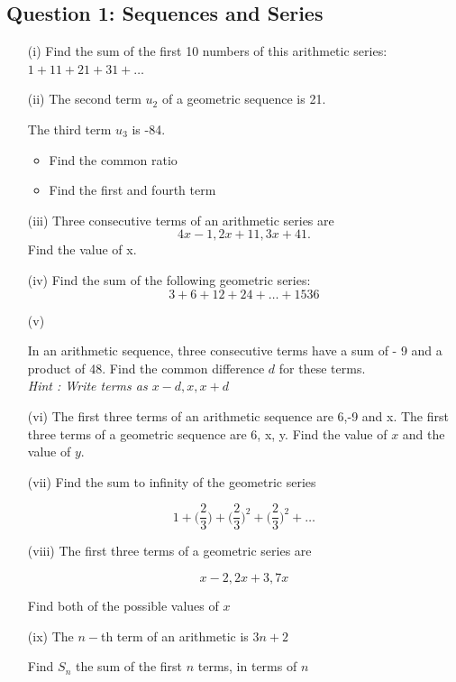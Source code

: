 \documentclass[]{article}
\begin{document}
\subsection*{Question 1:  Sequences and Series}

\begin{enumerate}
	\item[(i)] Find the sum of the first 10 numbers of this arithmetic series: $1 + 11 + 21 + 31 + \ldots$
	
	\item[(ii)] 
	The second term $u_2$ of a geometric sequence is 21.
	
	The third term $u_3$ is -84.
	\begin{itemize}
		\item Find the common ratio 
		\item Find the first and fourth term
	\end{itemize}
	
	\item[(iii)] Three consecutive terms of an arithmetic series are \[4x - 1, 2x +11, 3x + 41. \]
	Find the value of x.
	
	\item[(iv)] Find the sum of the following geometric series: 
	\[3 + 6 + 12 + 24 + \ldots + 1536\]
	
	\item[(v)] 
	
	In an arithmetic sequence, three consecutive terms have a sum of - 9 and a product of 48.
	Find the common difference $d$ for these terms.
	\\
	\textit{\textit{Hint : Write terms as $x-d,x,x+d$}}
	\item[(vi)]
	The first three terms of an arithmetic sequence are 6,-9 and x.
	The first three terms of a geometric sequence are 6, x, y.
	Find the value of $x$ and the value of $y$.
	
	\item[(vii)]
	Find the sum to infinity of the geometric series
	
	\[ 1 + \bigg(\frac{2}{3}\bigg) + \bigg(\frac{2}{3}\bigg)^2 + \bigg(\frac{2}{3}\bigg)^2 + \ldots \]
	\item[(viii)]
	The first three terms of a geometric series are
	
	\[ x-2 , 2x+3, 7x \]
	
	Find both of the possible values of $x$
	
	
	\item[(ix)]
	The $n-$th term of an arithmetic is $3n+2$
	
	Find $S_n$ the sum of the first $n$ terms, in terms of $n$
\end{enumerate}
\newpage
\end{document}
